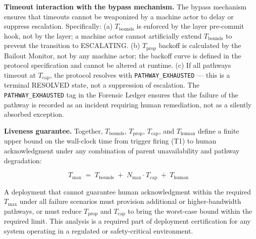 \bigskip
\noindent\textbf{Timeout interaction with the bypass mechanism.} The bypass mechanism ensures that timeouts cannot be weaponized by a machine actor to delay or suppress escalation. Specifically: (a) $T_{\text{bounds}}$ is enforced by the \fact{} layer pre-commit hook, not by the \bounds{} layer; a machine actor cannot artificially extend $T_{\text{bounds}}$ to prevent the transition to ESCALATING. (b) $T_{\text{prop}}$ backoff is calculated by the Bailout Monitor, not by any machine actor; the backoff curve is defined in the protocol specification and cannot be altered at runtime. (c) If all pathways timeout at $T_{\text{cap}}$, the protocol resolves with \texttt{PATHWAY\_EXHAUSTED} — this is a terminal RESOLVED state, not a suppression of escalation. The \texttt{PATHWAY\_EXHAUSTED} tag in the Forensic Ledger ensures that the failure of the pathway is recorded as an incident requiring human remediation, not as a silently absorbed exception.

\bigskip
\noindent\textbf{Liveness guarantee.} Together, $T_{\text{bounds}}$, $T_{\text{prop}}$, $T_{\text{cap}}$, and $T_{\text{human}}$ define a finite upper bound on the wall-clock time from trigger firing (T1) to human acknowledgment under any combination of parent unavailability and pathway degradation:

\begin{equation}
T_{\max} \;=\; T_{\text{bounds}} \;+\; N_{\max} \cdot T_{\text{cap}} \;+\; T_{\text{human}} \tag{T-max}
\end{equation}

A deployment that cannot guarantee human acknowledgment within the required $T_{\max}$ under all failure scenarios must provision additional or higher-bandwidth pathways, or must reduce $T_{\text{prop}}$ and $T_{\text{cap}}$ to bring the worst-case bound within the required limit. This analysis is a required part of deployment certification for any \bxthree{} system operating in a regulated or safety-critical environment.